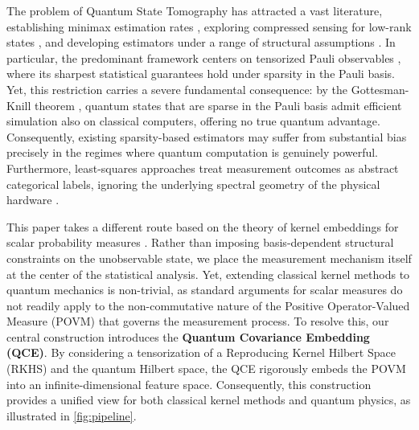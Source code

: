 \documentclass[noinfoline]{imsart}\setcounter{tocdepth}{2}
\theoremstyle{plain}
\begin{document}
The problem of Quantum State Tomography has attracted a vast literature, establishing minimax estimation rates \cite{gutaminmax, dongxiaminmax}, exploring compressed sensing for low-rank states \cite{gross2010quantum, gross2011recovering, flammia2012quantum}, and developing estimators under a range of structural assumptions \cite{artiles2005invitation, wang2013asymptotic, verdeil2022pure, gross2011recovering, acharya2025pauli, d2002quantum, christandl2012reliable, cramer2010efficient, cai2016optimal, georges2025pauli}. In particular, the predominant framework centers on tensorized Pauli observables \cite{acharya2025pauli, cai2016optimal, georges2025pauli}, where its sharpest statistical guarantees hold under sparsity in the Pauli basis. Yet, this restriction carries a severe fundamental consequence: by the Gottesman-Knill theorem \cite{gottesman1998heisenberg}, quantum states that are sparse in the Pauli basis admit efficient simulation also on classical computers, offering no true quantum advantage. Consequently, existing sparsity-based estimators may suffer from substantial bias precisely in the regimes where quantum computation is genuinely powerful. Furthermore, least-squares approaches treat measurement outcomes as abstract categorical labels, ignoring the underlying spectral geometry of the physical hardware  \cite{arecchi1972atomic,pegg1989phase,gottesman2001encoding}.

This paper takes a different route based on the theory of kernel embeddings for scalar probability measures \cite{fukumizu2004dimensionality, sriperumbudur2008injective, sriperumbudur2010hilbert,bach2022information}. Rather than imposing basis-dependent structural constraints on the unobservable state, we place the measurement mechanism itself at the center of the statistical analysis. Yet, extending classical kernel methods to quantum mechanics is non-trivial, as standard arguments for scalar measures do not readily apply to the non-commutative nature of the Positive Operator-Valued Measure (POVM) that governs the measurement process. To resolve this, our central construction introduces the \textbf{Quantum Covariance Embedding (QCE)}. By considering a tensorization of a Reproducing Kernel Hilbert Space (RKHS) and the quantum Hilbert space, the QCE rigorously embeds the POVM into an infinite-dimensional feature space. Consequently, this construction provides a unified view for both classical kernel methods and quantum physics, as illustrated in \cref{fig:pipeline}.
\end{document}
